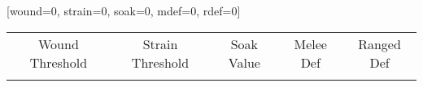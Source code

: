 %


\newcommand{\stats}[6]{
	\begin{center}
		\begin{tabular}{ | c | c | c | c | c | c | c | } \hline
			\textbf{Brwn} & \textbf{Agi} & \textbf{Int} & \textbf{Cun} & \textbf{Will} & \textbf{Pres} \\ \hline
			#1    & #2   & #3   & #4   & #5    & #6    \\ \hline
		\end{tabular} 
		\\[1em]
\end{center} 
}
\newkeycommand{\secondarystats}[wound=0, strain=0, soak=0, mdef=0, rdef=0]{
	\begin{center}
		\begin{tabular}{ | c | c | c | c | c | } \hline
		\tiny Wound Threshold & 
		\tiny Strain Threshold &
		\tiny Soak Value & 
		\tiny Melee Def & 
		\tiny Ranged Def \\[0.5em]
		\textbf{\commandkey{wound}} & 
		\textbf{\commandkey{strain}} & 
		\textbf{\commandkey{soak}} &
		\textbf{\commandkey{mdef}} &
		\textbf{\commandkey{rdef}}
		\\[0.05in] \hline
	\end{tabular}
	\end{center}
}

